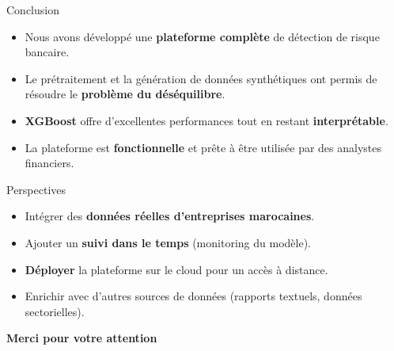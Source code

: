 \documentclass[10pt,aspectratio=169]{beamer}
\begin{document}
\begin{frame}{Conclusion}
  \begin{itemize}
    \item Nous avons développé une \textbf{plateforme complète} de
          détection de risque bancaire.
    \pause
    \item Le prétraitement et la génération de données synthétiques ont
          permis de résoudre le \textbf{problème du déséquilibre}.
    \pause
    \item \textbf{XGBoost} offre d'excellentes performances tout en
          restant \textbf{interprétable}.
    \pause
    \item La plateforme est \textbf{fonctionnelle} et prête à être
          utilisée par des analystes financiers.
  \end{itemize}
\end{frame}

\begin{frame}{Perspectives}
  \begin{itemize}
    \item Intégrer des \textbf{données réelles d'entreprises marocaines}.
    \pause
    \item Ajouter un \textbf{suivi dans le temps} (monitoring du modèle).
    \pause
    \item \textbf{Déployer} la plateforme sur le cloud pour un accès à
          distance.
    \pause
    \item Enrichir avec d'autres sources de données (rapports textuels,
          données sectorielles).
  \end{itemize}
\end{frame}

\begin{frame}[plain]
  \centering
  \vfill
  {\Huge \textcolor{rgblue}{\textbf{Merci pour votre attention}}}
  \vfill
\end{frame}
\end{document}
